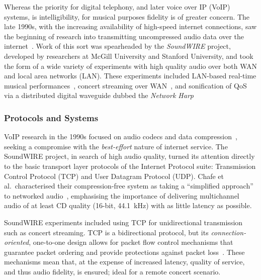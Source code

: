 \documentclass[utf8]{FrontiersinHarvard}
\begin{document}
    Whereas the priority for digital telephony, and later voice over IP (VoIP)
    systems, is intelligibility, for musical purposes fidelity is of greater
    concern.
    The late 1990s, with the increasing availability of high-speed internet
    connections, saw the beginning of research into transmitting uncompressed audio
    data over the internet~\citep{chafe_simplified_2000,xu_real-time_2000}.
    Work of this sort was spearheaded by the \textit{SoundWIRE} project, developed
    by researchers at McGill University and Stanford University, and took the form
    of a wide variety of experiments with high quality audio over both WAN and local
    area networks (LAN).
    These experiments included LAN-based real-time musical
    performances~\citep{chafe_simplified_2000}, concert streaming over
    WAN~\citep{xu_real-time_2000,chafe_simplified_2000}, and sonification of QoS via
    a distributed digital waveguide dubbed the
    \textit{Network Harp}~\citep{chafe_simplified_2000,chafe_physical_2002}

    \subsubsection{Protocols and Systems}\label{subsubsec:protocols-systems}

    VoIP research in the 1990s focused on audio codecs and data
    compression~\citep{turletti_inria_1994,hardman_successful_1998}, seeking a
    compromise with the \textit{best-effort} nature of internet service.
    The SoundWIRE project, in search of high audio quality, turned its attention
    directly to the basic transport layer protocols of the Internet Protocol suite:
    Transmission Control Protocol (TCP) and User Datagram Protocol (UDP).
    Chafe et al.\ characterised their compression-free system as taking a
    ``simplified approach'' to networked audio~\citep{chafe_simplified_2000},
    emphasising the importance of delivering multichannel audio of at least CD
    quality (16-bit, \qty{44.1}{\kHz}) with as little latency as possible.

    SoundWIRE experiments included using TCP for unidirectional transmission
    such as concert streaming.
    TCP is a bidirectional protocol, but its \textit{connection-oriented},
    one-to-one design allows for packet flow control mechanisms that guarantee
    packet ordering and provide protections against packet
    loss~\citep{schiavoni_alternatives_2013,al-dhief_performance_2018}.
    These mechanisms mean that, at the expense of increased latency, quality of
    service, and thus audio fidelity, is ensured; ideal for a remote concert
    scenario.
\end{document}
